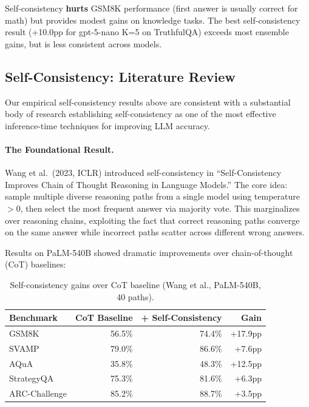 \documentclass[11pt,a4paper]{article}
\begin{document}
Self-consistency \textbf{hurts} GSM8K performance (first answer is usually correct for math) but provides modest gains on knowledge tasks.
The best self-consistency result (+10.0pp for gpt-5-nano K=5 on TruthfulQA) exceeds most ensemble gains, but is less consistent across models.

\subsection{Self-Consistency: Literature Review}
\label{sec:sc_literature}

Our empirical self-consistency results above are consistent with a substantial body of research establishing self-consistency as one of the most effective inference-time techniques for improving LLM accuracy.

\paragraph{The Foundational Result.}
Wang et al.\ (2023, ICLR) introduced self-consistency in ``Self-Consistency Improves Chain of Thought Reasoning in Language Models.''
The core idea: sample multiple diverse reasoning paths from a single model using temperature $> 0$, then select the most frequent answer via majority vote.
This marginalizes over reasoning chains, exploiting the fact that correct reasoning paths converge on the same answer while incorrect paths scatter across different wrong answers.

Results on PaLM-540B showed dramatic improvements over chain-of-thought (CoT) baselines:

\begin{table}[htbp]
\centering
\caption{Self-consistency gains over CoT baseline (Wang et al., PaLM-540B, 40 paths).}
\label{tab:sc_wang}
\begin{tabular}{lrrr}
\toprule
\textbf{Benchmark} & \textbf{CoT Baseline} & \textbf{+ Self-Consistency} & \textbf{Gain} \\
\midrule
GSM8K & 56.5\% & 74.4\% & +17.9pp \\
SVAMP & 79.0\% & 86.6\% & +7.6pp \\
AQuA & 35.8\% & 48.3\% & +12.5pp \\
StrategyQA & 75.3\% & 81.6\% & +6.3pp \\
ARC-Challenge & 85.2\% & 88.7\% & +3.5pp \\
\bottomrule
\end{tabular}
\end{table}
\end{document}
